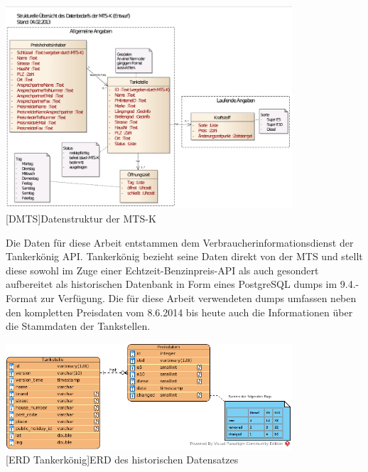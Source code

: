 \documentclass[12pt,a4paper,bibliography=totocnumbered,listof=totocnumbered]{scrartcl}
\begin{document}

\begin{center}
	\includegraphics[width=0.8\textwidth]{Bilder/Datenstruktur-MTS.png}\\
	[DMTS]{Datenstruktur der MTS-K\cite{DMTSK}}
	\label{fig:MTS-K}
\end{center}

Die Daten für diese Arbeit entstammen dem Verbraucherinformationsdienst der Tankerkönig API. Tankerkönig bezieht seine Daten direkt von der MTS  und stellt diese sowohl im Zuge einer Echtzeit-Benzinpreis-API als auch gesondert aufbereitet als historischen Datenbank in Form eines PostgreSQL dumps im 9.4.-Format zur Verfügung. Die für diese Arbeit verwendeten dumps umfassen neben den kompletten Preisdaten vom 8.6.2014 bis heute auch die Informationen über die Stammdaten der Tankstellen.\cite{TkAPI} 

\begin{center}
	\includegraphics[width=0.8\textwidth]{Bilder/pricing_data.png}\\
	[ERD Tankerkönig]{ERD des historischen Datensatzes}
	\label{fig:ERD-T}
\end{center}
\end{document}
